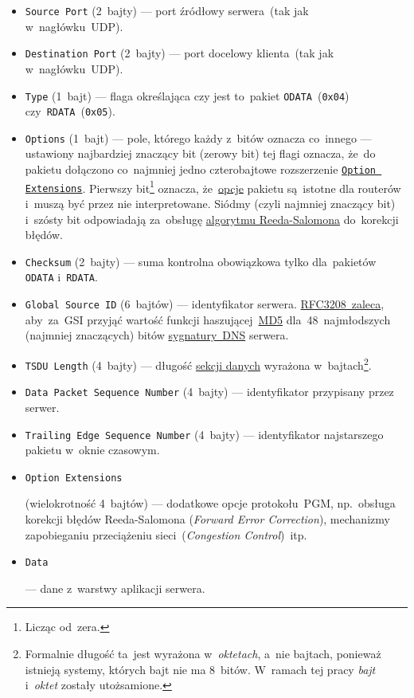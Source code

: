 \documentclass[thesis]{subfiles}
\begin{document}
\begin{itemize}
	\item \texttt{Source~Port} (2~bajty) --- port źródłowy serwera~(tak jak w~nagłówku~UDP).
	\item \texttt{Destination~Port} (2~bajty) --- port docelowy klienta~(tak jak w~nagłówku~UDP).
	\item \texttt{Type} (1~bajt) --- flaga określająca czy jest to~pakiet \texttt{ODATA}~(\texttt{0x04}) czy~\texttt{RDATA}~(\texttt{0x05}).
	\item \texttt{Options} (1~bajt) --- pole, którego każdy z~bitów oznacza co~innego --- ustawiony najbardziej znaczący bit (zerowy bit) tej flagi oznacza, że~do pakietu dołączono co~najmniej jedno czterobajtowe rozszerzenie \hyperlink{itm:optext}{\texttt{Option Extensions}}. Pierwszy bit\footnote{Licząc od~zera.} oznacza, że~\hyperlink{itm:optext}{opcje} pakietu są~istotne dla routerów i~muszą być przez nie interpretowane. Siódmy (czyli najmniej znaczący bit) i~szósty bit odpowiadają za~obsługę \href{https://en.wikipedia.org/wiki/Reed\%E2\%80\%93Solomon\_error\_correction}{algorytmu Reeda-Salomona} do~korekcji błędów.
	\item \texttt{Checksum} (2~bajty) --- suma kontrolna obowiązkowa tylko dla~pakietów \texttt{ODATA} i~\texttt{RDATA}.
	\item \texttt{Global Source~ID} (6~bajtów) --- identyfikator serwera. \href{https://tools.ietf.org/html/rfc3208\#page-33}{RFC3208~zaleca}, aby~za~GSI przyjąć wartość funkcji haszującej~\href{https://en.wikipedia.org/wiki/MD5}{MD5} dla~48~najmłodszych (najmniej znaczących) bitów \href{https://tools.ietf.org/html/rfc2535\#section-4}{sygnatury~DNS} serwera.
	\item \texttt{TSDU~Length} (4~bajty) --- długość \hyperlink{itm:datasec}{sekcji danych} wyrażona w~bajtach\footnote{Formalnie długość ta~jest wyrażona w~\emph{oktetach}, a~nie bajtach, ponieważ istnieją systemy, których bajt nie ma 8~bitów. W~ramach tej pracy \emph{bajt} i~\emph{oktet} zostały utożsamione.}.
	\item \texttt{Data Packet Sequence Number} (4~bajty) --- identyfikator przypisany przez serwer.
	\item \texttt{Trailing Edge Sequence Number} (4~bajty) --- identyfikator najstarszego pakietu w~oknie czasowym.
	\item \hypertarget{itm:optext}{\texttt{Option Extensions}} (wielokrotność 4~bajtów) --- dodatkowe opcje protokołu~PGM, np.~obsługa korekcji błędów Reeda-Salomona (\emph{Forward Error Correction}), mechanizmy zapobieganiu przeciążeniu sieci~(\emph{Congestion Control})~itp.
	\item \hypertarget{itm:datasec}{\texttt{Data}} --- dane z~warstwy aplikacji serwera.
\end{itemize}
\end{document}
